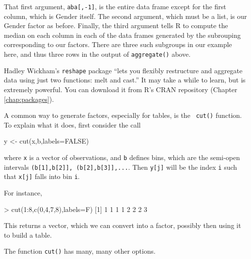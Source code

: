 \noindent
That first argument, {\tt aba[,-1]}, is the entire data frame except for
the first column, which is Gender itself.  The second argument, which
must be a list, is our Gender factor as before.  Finally, the third
argument tells R to compute the median on each column in each of the 
data frames generated by the subrouping corresponding to our factors.
There are three such subgroups in our example here, and thus three rows
in the output of {\tt aggregate()} above.

Hadley Wickham's {\tt reshape} package ``lets you flexibly restructure
and aggregate data using just two functions: melt and cast.''  It may
take a while to learn, but is extremely powerful.  You can download it
from R's CRAN repository (Chapter \ref{chap:packages}).

A common way to generate factors, especially for tables, is the {\tt
cut()} function.  To explain what it does, first consider the call

\begin{Code}
y <- cut(x,b,labels=FALSE)
\end{Code}

\noindent
where {\tt x} is a vector of observations, and {\tt b} defines bins,
which are the semi-open intervals {\tt (b[1],b[2]], (b[2],b[3]],...}.
Then {\tt y[j]} will be the index {\tt i} such that {\tt x[j]} falls
into bin {\tt i}.

For instance,

\begin{Code}
> cut(1:8,c(0,4,7,8),labels=F)
[1] 1 1 1 1 2 2 2 3
\end{Code}

\noindent
This returns a vector, which we can convert into a factor, possibly then
using it to build a table.

The function {\tt cut()} has many, many other options.

